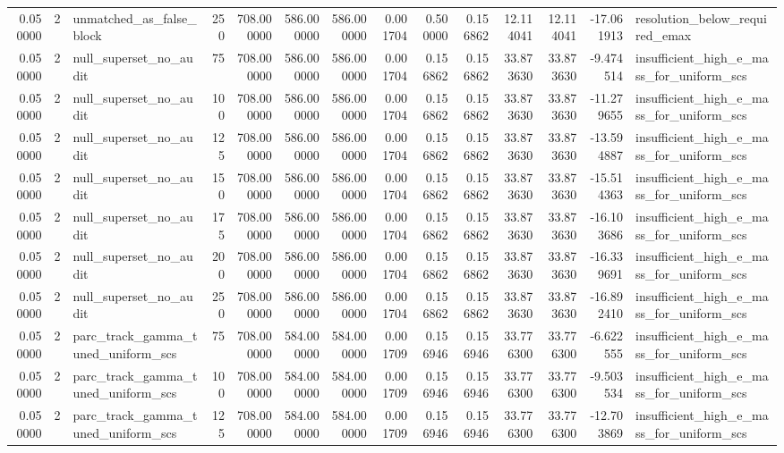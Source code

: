\begin{tabular}{rrlrrrrrrrrrrl}
0.050000 & 2 & unmatched_as_false_block & 250 & 708.000000 & 586.000000 & 586.000000 & 0.001704 & 0.500000 & 0.156862 & 12.114041 & 12.114041 & -17.061913 & resolution_below_required_emax \\
0.050000 & 2 & null_superset_no_audit & 75 & 708.000000 & 586.000000 & 586.000000 & 0.001704 & 0.156862 & 0.156862 & 33.873630 & 33.873630 & -9.474514 & insufficient_high_e_mass_for_uniform_scs \\
0.050000 & 2 & null_superset_no_audit & 100 & 708.000000 & 586.000000 & 586.000000 & 0.001704 & 0.156862 & 0.156862 & 33.873630 & 33.873630 & -11.279655 & insufficient_high_e_mass_for_uniform_scs \\
0.050000 & 2 & null_superset_no_audit & 125 & 708.000000 & 586.000000 & 586.000000 & 0.001704 & 0.156862 & 0.156862 & 33.873630 & 33.873630 & -13.594887 & insufficient_high_e_mass_for_uniform_scs \\
0.050000 & 2 & null_superset_no_audit & 150 & 708.000000 & 586.000000 & 586.000000 & 0.001704 & 0.156862 & 0.156862 & 33.873630 & 33.873630 & -15.514363 & insufficient_high_e_mass_for_uniform_scs \\
0.050000 & 2 & null_superset_no_audit & 175 & 708.000000 & 586.000000 & 586.000000 & 0.001704 & 0.156862 & 0.156862 & 33.873630 & 33.873630 & -16.103686 & insufficient_high_e_mass_for_uniform_scs \\
0.050000 & 2 & null_superset_no_audit & 200 & 708.000000 & 586.000000 & 586.000000 & 0.001704 & 0.156862 & 0.156862 & 33.873630 & 33.873630 & -16.339691 & insufficient_high_e_mass_for_uniform_scs \\
0.050000 & 2 & null_superset_no_audit & 250 & 708.000000 & 586.000000 & 586.000000 & 0.001704 & 0.156862 & 0.156862 & 33.873630 & 33.873630 & -16.892410 & insufficient_high_e_mass_for_uniform_scs \\
0.050000 & 2 & parc_track_gamma_tuned_uniform_scs & 75 & 708.000000 & 584.000000 & 584.000000 & 0.001709 & 0.156946 & 0.156946 & 33.776300 & 33.776300 & -6.622555 & insufficient_high_e_mass_for_uniform_scs \\
0.050000 & 2 & parc_track_gamma_tuned_uniform_scs & 100 & 708.000000 & 584.000000 & 584.000000 & 0.001709 & 0.156946 & 0.156946 & 33.776300 & 33.776300 & -9.503534 & insufficient_high_e_mass_for_uniform_scs \\
0.050000 & 2 & parc_track_gamma_tuned_uniform_scs & 125 & 708.000000 & 584.000000 & 584.000000 & 0.001709 & 0.156946 & 0.156946 & 33.776300 & 33.776300 & -12.703869 & insufficient_high_e_mass_for_uniform_scs \\

\end{tabular}
